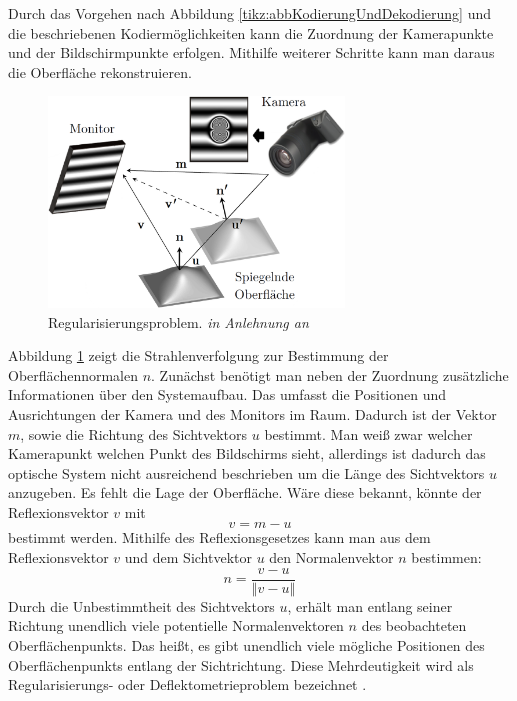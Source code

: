 Durch das Vorgehen nach Abbildung \ref{tikz:abbKodierungUndDekodierung} und die beschriebenen Kodiermöglichkeiten kann die Zuordnung der Kamerapunkte und der Bildschirmpunkte erfolgen.
Mithilfe weiterer Schritte kann man daraus die Oberfläche rekonstruieren.
%
\begin{figure}[H]
	\centering
	\includegraphics[width=0.7\textwidth]{02_grundlagenZurDeflektometrie/rekonstruktion/rekonstruktionUndRegularisierungsproblem/figures/regularisierungsproblem}
	\caption[Regularisierungsproblem]{Regularisierungsproblem. \textit{in Anlehnung an} \cite{stereoDeflektometrie}}
	\label{img:regularisierungsproblem}
\end{figure}
%
\noindent
Abbildung \ref{img:regularisierungsproblem} zeigt die Strahlenverfolgung zur Bestimmung der Oberflächennormalen $n$.
Zunächst benötigt man neben der Zuordnung zusätzliche Informationen über den Systemaufbau.
Das umfasst die Positionen und Ausrichtungen der Kamera und des Monitors im Raum.
Dadurch ist der Vektor $m$, sowie die Richtung des Sichtvektors $u$ bestimmt.
Man weiß zwar welcher Kamerapunkt welchen Punkt des Bildschirms sieht, allerdings ist dadurch das optische System nicht ausreichend beschrieben um die Länge des Sichtvektors $u$ anzugeben.
Es fehlt die Lage der Oberfläche.
Wäre diese bekannt, könnte der Reflexionsvektor $v$ mit 
\begin{equation*}
	v = m - u
\end{equation*}
bestimmt werden.
Mithilfe des Reflexionsgesetzes kann man aus dem Reflexionsvektor $v$ und dem Sichtvektor $u$ den Normalenvektor $n$ bestimmen:
%
\begin{equation}
	n = \dfrac{v - u}{\left\Vert v - u \right\Vert}	
\end{equation}
%
Durch die Unbestimmtheit des Sichtvektors $u$, erhält man entlang seiner Richtung unendlich viele potentielle Normalenvektoren $n$ des beobachteten Oberflächenpunkts.
Das heißt, es gibt unendlich viele mögliche Positionen des Oberflächenpunkts entlang der Sichtrichtung.
Diese Mehrdeutigkeit wird als Regularisierungs- oder Deflektometrieproblem bezeichnet \cite{regularisierungsproblem}.

